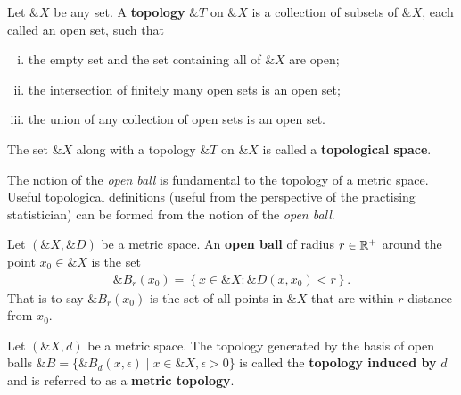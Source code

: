 
\begin{definition}%
  \label{def:topology1}
  Let $\&X$ be any set. A \textbf{topology} $\&T$ on $\&X$ is a
  collection of subsets of $\&X$, each called an open set, such that
  \begin{enumerate}[(i)]
  \item the empty set and the set containing all of $\&X$ are open;
  \item the intersection of finitely many open sets is an open set;
  \item the union of any collection of open sets is an open set.
  \end{enumerate} The set $\&X$ along with a topology $\&T$ on $\&X$
  is called a \textbf{topological space}.
\end{definition}

The notion of the \textit{open ball} is fundamental to the topology of
a metric space.  Useful topological definitions (useful from the
perspective of the practising statistician) can be formed from the
notion of the \textit{open ball}.

\begin{definition}%
  \label{def:open-ball}
  Let $(\&X, \&D)$ be a metric space. An \textbf{open ball} of radius
  $r \in \mathbb{R}^+$ around the point $x_0 \in \&X$ is the set
  \begin{align}
    \&B_r(x_0) = \left\{ x \in \&X : \&D(x,x_0) < r \right\}.
  \end{align}
  That is to say $\&B_r(x_0)$ is the set of all points in $\&X$ that
  are within $r$ distance from $x_0$.
\end{definition}

\begin{definition}%
  \label{def:topology2}
  Let $(\&X, d)$ be a metric space.  The topology generated by the
  basis of open balls
  $\&B = \{\&B_d(x, \epsilon) \mid x \in \&X, \epsilon > 0\}$ is
  called the \textbf{topology induced by} $d$ and is referred to as a
  \textbf{metric topology}.
\end{definition}

